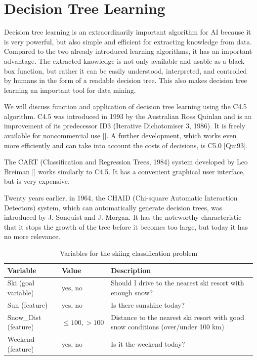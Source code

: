 \documentclass[10pt]{book}
\begin{document}
\section{Decision Tree Learning}
Decision tree learning is an extraordinarily important algorithm for AI because it is very powerful, but also simple and efficient for extracting knowledge from data. Compared to the two already introduced learning algorithms, it has an important advantage. The extracted knowledge is not only available and usable as a black box function, but rather it can be easily understood, interpreted, and controlled by humans in the form of a readable decision tree. This also makes decision tree learning an important tool for data mining.

We will discuss function and application of decision tree learning using the C4.5 algorithm. C4.5 was introduced in 1993 by the Australian Ross Quinlan and is an improvement of its predecessor ID3 (Iterative Dichotomiser 3, 1986). It is freely available for noncommercial use [\cite{quinlan1993c45}]. A further development, which works even more efficiently and can take into account the costs of decisions, is C5.0 [Qui93].

The CART (Classification and Regression Trees, 1984) system developed by Leo Breiman [\cite{breiman1984cart}] works similarly to C4.5. It has a convenient graphical user interface, but is very expensive.

Twenty years earlier, in 1964, the CHAID (Chi-square Automatic Interaction Detectors) system, which can automatically generate decision trees, was introduced by J. Sonquist and J. Morgan. It has the noteworthy characteristic that it stops the growth of the tree before it becomes too large, but today it has no more relevance.

\begin{table}
\centering
\caption{Variables for the skiing classification problem}
\begin{tabular}{|l|l|l|}
\hline
Variable & Value & Description \\
\hline
Ski (goal variable) & yes, no & Should I drive to the nearest ski resort with enough snow? \\
\hline
Sun (feature) & yes, no & Is there sunshine today? \\
\hline
Snow\_Dist (feature) & $\leq 100, >100$ & Distance to the nearest ski resort with good snow conditions (over/under 100 km) \\
\hline
Weekend (feature) & yes, no & Is it the weekend today? \\
\hline
\end{tabular}
\end{table}
\end{document}
